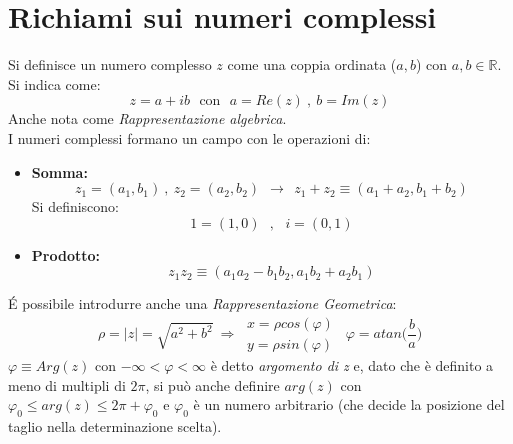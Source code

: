\documentclass[twoside]{article}
\begin{document}
\begin{comment}
\epigraph{La tristezza durerà per sempre}{\textit{Vincent Van Gogh, \\
biglietto lasciato prima di suicidarsi.}}
\end{comment}
\newpage

\setcounter{definition}{-1}
\setcounter{section}{0}

\tableofcontents


\newpage

\section{Richiami sui numeri complessi}
Si definisce un numero complesso $z$ come una coppia ordinata ($a,b$) con $a,b \in \mathds{R}$. Si indica come:
\begin{equation}
    z=a+ib \ \ \ \text{con} \ \ \ a=Re(z) \ , \ b=Im(z)
\end{equation}
Anche nota come \textit{Rappresentazione algebrica}. \\
I numeri complessi formano un campo con le operazioni di:
\begin{itemize}
    \item \textbf{Somma:} 
    \begin{equation}
        z_1=(a_1,b_1) \ , \ z_2=(a_2,b_2) \ \ \rightarrow \ \ z_1+z_2\equiv(a_1+a_2,b_1+b_2)
    \end{equation}
    Si definiscono:
    \begin{equation}
        1=(1,0) \ \ \ , \ \ \ i=(0,1)
    \end{equation}
    \item \textbf{Prodotto:}
    \begin{equation}
        z_1z_2 \equiv(a_1 a_2 - b_1 b_2, a_1 b_2 + a_2 b_1)
    \end{equation}
\end{itemize}
\'E possibile introdurre anche una \textit{Rappresentazione Geometrica}:
\begin{equation}
    \rho=|z|=\sqrt{a^2 + b^2} \ \Rightarrow \
    \begin{array}{c}
        x=\rho cos(\varphi)  \\
        y=\rho sin(\varphi)
    \end{array} \ \ \varphi = atan\biggl(\frac{b}{a}\biggr)
\end{equation}
$\varphi\equiv Arg(z)$ con $-\infty < \varphi < \infty$ è detto \textit{argomento di z} e, dato che è definito a meno di multipli di $2\pi$, si può anche definire $arg(z)$ con $\varphi_0 \leq arg(z) \leq 2\pi+\varphi_0$ e $\varphi_0$ è un numero arbitrario (che decide la posizione del taglio nella determinazione scelta).
\end{document}
